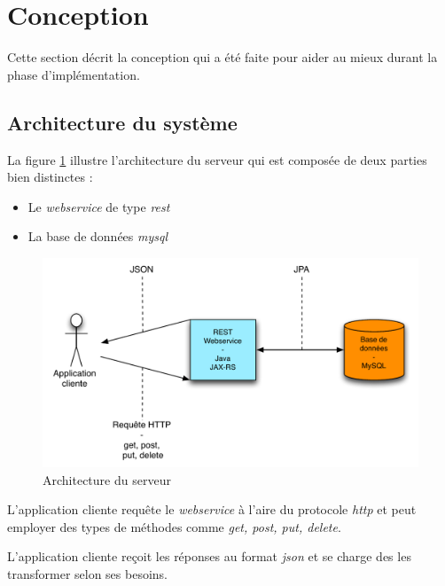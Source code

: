 
\section{Conception}
\label{section:conception_serveur}

Cette section décrit la conception qui a été faite pour aider au mieux durant la phase d'implémentation.


\subsection{Architecture du système}
La figure \ref{gra:archiServeur} illustre l'architecture du serveur qui est composée de deux parties bien distinctes : 

\medskip

\begin{itemize}
	\item Le \emph{\gls{webservice}} de type \emph{\gls{rest}}
	\item La base de données \emph{\gls{mysql}}
\end{itemize}


\begin{figure}[H]
      \centering
      \includegraphics[width=14cm]{00_media/04_Serveur_archi.pdf}
      \caption{Architecture du serveur}
      \label{gra:archiServeur}
\end{figure}

L'application cliente requête le \emph{\gls{webservice}} à l'aire du protocole \emph{\gls{http}} et peut employer des types de méthodes comme \emph{get, post, put, delete}.

\medskip

L'application cliente reçoit les réponses au format \emph{\gls{json}} et se charge des les transformer selon ses besoins.

